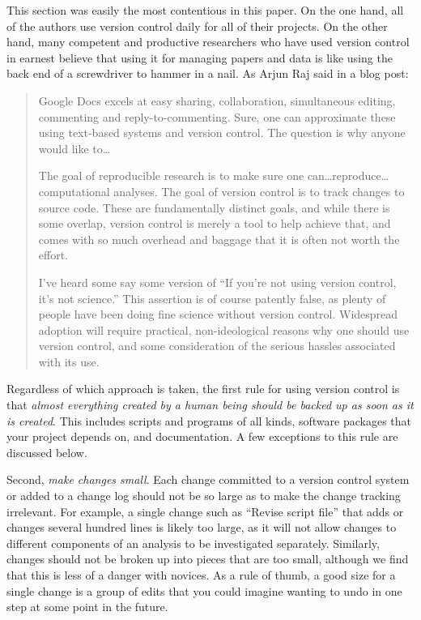 \documentclass[10pt]{article}
\newcommand{\recommend}[1]{\textit{#1}}
\begin{document}
This section was easily the most contentious in this paper.  On the
one hand, all of the authors use version control daily for all of
their projects.  On the other hand, many competent and productive
researchers who have used version control in earnest believe that
using it for managing papers and data is like using the back end of a
screwdriver to hammer in a nail.  As Arjun Raj said in a blog post:

\begin{quote}
Google Docs excels at easy sharing, collaboration, simultaneous
editing, commenting and reply-to-commenting. Sure, one can approximate
these using text-based systems and version control. The question is
why anyone would like to{\ldots}

The goal of reproducible research is to make sure one
can{\dots}reproduce{\ldots}computational analyses. The goal of version
control is to track changes to source code. These are fundamentally
distinct goals, and while there is some overlap, version control is
merely a tool to help achieve that, and comes with so much overhead
and baggage that it is often not worth the effort.

I've heard some say some version of ``If you're not using version
control, it's not science.'' This assertion is of course patently
false, as plenty of people have been doing fine science without
version control. Widespread adoption will require practical,
non-ideological reasons why one should use version control, and some
consideration of the serious hassles associated with its use.
\end{quote}

Regardless of which approach is taken, the first rule for using
version control is that \recommend{almost everything created by a
  human being should be backed up as soon as it is created}. This
includes scripts and programs of all kinds, software packages that
your project depends on, and documentation. A few exceptions to this
rule are discussed below.

Second, \recommend{make changes small}.  Each change committed to a
version control system or added to a change log should not be so large
as to make the change tracking irrelevant. For example, a single
change such as ``Revise script file'' that adds or changes several
hundred lines is likely too large, as it will not allow changes to
different components of an analysis to be investigated
separately. Similarly, changes should not be broken up into pieces
that are too small, although we find that this is less of a danger
with novices. As a rule of thumb, a good size for a single change is a
group of edits that you could imagine wanting to undo in one step at
some point in the future.
\end{document}
